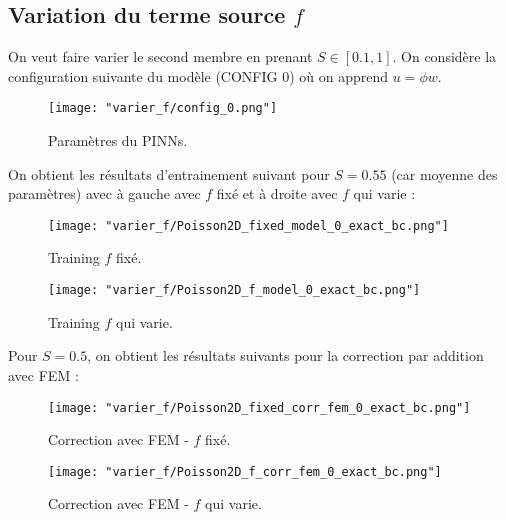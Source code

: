 \subsection{Variation du terme source $f$}

On veut faire varier le second membre en prenant $S\in[0.1,1]$. On considère la configuration suivante du modèle (CONFIG 0) où on apprend $u=\phi w$.
	
\begin{figure}[H]
	\centering
	\texttt{[image: "varier\_f/config\_0.png"]}
	\caption{Paramètres du PINNs.}
	\label{config_0}
\end{figure}

On obtient les résultats d'entrainement suivant pour $S=0.55$ (car moyenne des paramètres) avec à gauche avec $f$ fixé et à droite avec $f$ qui varie :

\begin{minipage}{0.48\linewidth}
	\begin{figure}[H]
		\centering
		\texttt{[image: "varier\_f/Poisson2D\_fixed\_model\_0\_exact\_bc.png"]}
		\caption{Training $f$ fixé.}
		\label{Poisson2D_fixed_model_0_exact_bc}
	\end{figure}
\end{minipage}
\begin{minipage}{0.48\linewidth}
	\begin{figure}[H]
		\centering
		\texttt{[image: "varier\_f/Poisson2D\_f\_model\_0\_exact\_bc.png"]}
		\caption{Training $f$ qui varie.}
		\label{Poisson2D_f_model_0_exact_bc}
	\end{figure}
\end{minipage}

Pour $S=0.5$, on obtient les résultats suivants pour la correction par addition avec FEM :

\begin{minipage}{0.48\linewidth}
	\begin{figure}[H]
		\centering
		\texttt{[image: "varier\_f/Poisson2D\_fixed\_corr\_fem\_0\_exact\_bc.png"]}
		\caption{Correction avec FEM - $f$ fixé.}
		\label{Poisson2D_fixed_corr_fem_0_exact_bc}
	\end{figure}
\end{minipage}
\begin{minipage}{0.48\linewidth}
	\begin{figure}[H]
		\centering
		\texttt{[image: "varier\_f/Poisson2D\_f\_corr\_fem\_0\_exact\_bc.png"]}
		\caption{Correction avec FEM - $f$ qui varie.}
		\label{Poisson2D_f_corr_fem_0_exact_bc}
	\end{figure}
\end{minipage}

